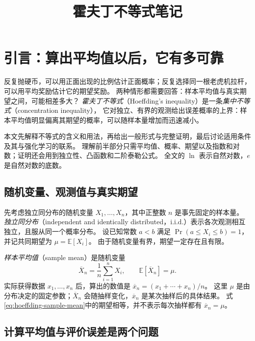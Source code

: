 \documentclass[UTF8,12pt,a4paper,fontset=fandol]{ctexart}
\title{霍夫丁不等式笔记}
\author{}
\date{}
\begin{document}
\maketitle

\section{引言：算出平均值以后，它有多可靠}
\label{sec:hoeffding-introduction}

反复抛硬币，可以用正面出现的比例估计正面概率；反复选择同一根老虎机拉杆，可以用平均奖励估计它的期望奖励。
两种情形都需要回答：样本平均值与真实期望之间，可能相差多大？
\emph{霍夫丁不等式}（Hoeffding's inequality）是一条\emph{集中不等式}（concentration inequality），
它对独立、有界的观测给出误差概率的上界：样本平均值明显偏离其期望的概率，可以随样本量增加而迅速减小。

本文先解释不等式的含义和用法，再给出一般形式与完整证明，最后讨论适用条件及其与强化学习的联系。
理解前半部分只需平均值、概率、期望以及指数和对数；证明还会用到独立性、凸函数和二阶泰勒公式。
全文的 $\ln$ 表示自然对数，$e$ 是自然对数的底数。

\subsection{随机变量、观测值与真实期望}

先考虑独立同分布的随机变量 $X_1,\ldots,X_n$，其中正整数 $n$ 是事先固定的样本量。
\emph{独立同分布}（independent and identically distributed，i.i.d.）表示各次观测相互独立，且服从同一个概率分布。
设已知常数 $a<b$ 满足 $\Pr(a\leq X_i\leq b)=1$，并记共同期望为 $\mu=\mathbb E[X_i]$。
由于随机变量有界，期望一定存在且有限。

\emph{样本平均值}（sample mean）是随机变量
\begin{equation}
  \overline X_n=\frac1n\sum_{i=1}^{n}X_i,
  \qquad \mathbb E[\overline X_n]=\mu.
  \label{eq:hoeffding-sample-mean}
\end{equation}
实际获得数据 $x_1,\ldots,x_n$ 后，算出的数值是
$\overline x_n=(x_1+\cdots+x_n)/n$。
这里 $\mu$ 是由分布决定的固定参数；$\overline X_n$ 会随抽样变化，$\overline x_n$ 是某次抽样后的具体结果。
式\eqref{eq:hoeffding-sample-mean}中的期望相等，并不表示每次抽样都有 $\overline x_n=\mu$。

\subsection{计算平均值与评价误差是两个问题}
\end{document}
